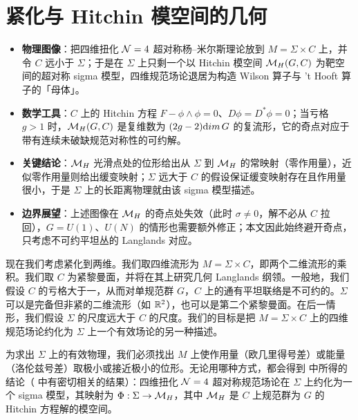 
\section{紧化与 Hitchin 模空间的几何}

\label{sec:compacthitchin}

\begin{keytakeaways}
\begin{itemize}[leftmargin=1.4em,itemsep=2pt,topsep=2pt]
\item \textbf{物理图像}：把四维扭化 ${\EUN}=4$ 超对称杨--米尔斯理论放到 $M=\Sigma\times C$ 上，并令 $C$ 远小于 $\Sigma$；于是在 $\Sigma$ 上只剩一个以 Hitchin 模空间 $\MH(G,C)$ 为靶空间的超对称 sigma 模型，四维规范场论退居为构造 Wilson 算子与 't Hooft 算子的「母体」。
\item \textbf{数学工具}：$C$ 上的 Hitchin 方程 $F-\phi\wedge\phi=0$、$D\phi=D^*\phi=0$；当亏格 $g>1$ 时，$\MH(G,C)$ 是复维数为 $(2g-2){\rm dim}\,G$ 的复流形，它的奇点对应于带有连续未破缺规范对称性的可约解。
\item \textbf{关键结论}：$\MH$ 光滑点处的位形给出从 $\Sigma$ 到 $\MH$ 的常映射（零作用量），近似零作用量则给出缓变映射；$\Sigma$ 远大于 $C$ 的假设保证缓变映射存在且作用量很小，于是 $\Sigma$ 上的长距离物理就由该 sigma 模型描述。
\item \textbf{边界展望}：上述图像在 $\MH$ 的奇点处失效（此时 $\sigma\not=0$，解不必从 $C$ 拉回），$G=U(1)$、$U(N)$ 的情形也需要额外修正；本文因此始终避开奇点，只考虑不可约平坦丛的 Langlands 对应。
\end{itemize}
\end{keytakeaways}

现在我们考虑紧化到两维。我们取四维流形为 $M=\Sigma\times C$，即两个二维流形的乘积。我们取 $C$ 为紧黎曼面，并将在其上研究几何 Langlands 纲领。一般地，我们假设 $C$ 的亏格大于一，从而对单规范群 $G$，$C$ 上的通有平坦联络是不可约的。$\Sigma$ 可以是完备但非紧的二维流形（如 $\Bbb{R}^2$），也可以是第二个紧黎曼面。在后一情形，我们假设 $\Sigma$ 的尺度远大于 $C$ 的尺度。我们的目标是把 $M=\Sigma\times C$ 上的四维规范场论约化为 $\Sigma$ 上一个有效场论的另一种描述。

为求出 $\Sigma$ 上的有效物理，我们必须找出 $M$ 上使作用量（欧几里得号差）或能量（洛伦兹号差）取极小或接近极小的位形。无论用哪种方式，都会得到 \cite{ref18} 中所得的结论（\cite{ref19} 中有密切相关的结果）：四维扭化 ${\EUN}=4$ 超对称规范场论在 $\Sigma$ 上约化为一个 sigma 模型，其映射为 $\Phi:\Sigma\to\MH$，其中 $\MH$ 是 $C$ 上规范群为 $G$ 的 Hitchin 方程解的模空间。

